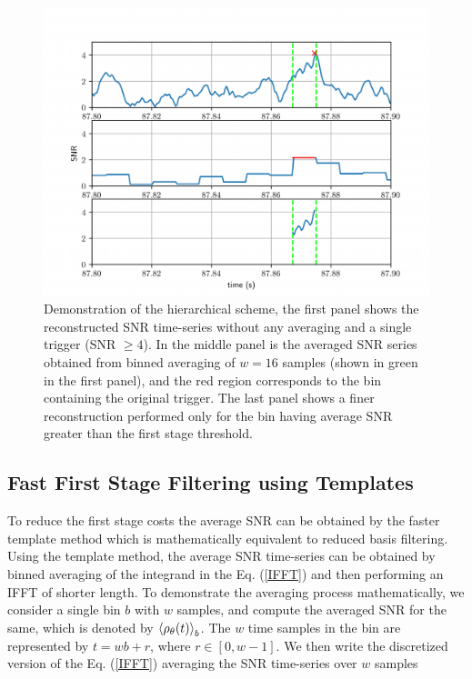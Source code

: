 \begin{figure}
    \centering
    \includegraphics[width=\linewidth]{figures/Hierarchical_MF/zoomed.pdf}
    \caption{Demonstration of the hierarchical scheme, the first panel shows the reconstructed SNR time-series without any averaging and a single trigger (SNR $\geq 4$). In the middle panel is the averaged SNR series obtained from binned averaging of $w=16$ samples (shown in green in the first panel), and the red region corresponds to the bin containing the original trigger. The last panel shows a finer reconstruction performed only for the bin having average SNR greater than the first stage threshold.}
    \label{zoomed}
\end{figure}

\subsection{Fast First Stage Filtering using Templates}\label{sec:fft_first_stage}

To reduce the first stage costs the average SNR can be obtained by the faster template method which is mathematically equivalent to reduced basis filtering. Using the template method, the average SNR time-series can be obtained by binned averaging of the integrand in the Eq. (\ref{IFFT}) and then performing an IFFT of shorter length. To demonstrate the averaging process mathematically, we consider a single bin $b$ with $w$ samples, and compute the averaged SNR for the same, which is denoted by $\Braket{\rho_{\theta}(t)}_b$.  
The $w$ time samples in the bin are represented by $t = wb + r$, where $r \in [0, w-1]$. We then write the discretized version of the Eq. (\ref{IFFT}) averaging the SNR time-series over $w$ samples 

